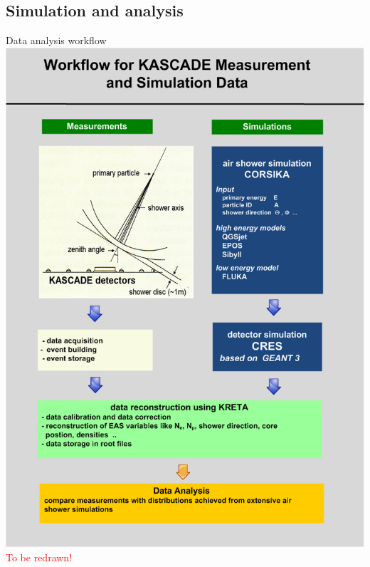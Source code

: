 \documentclass[18pt]{beamer}
\begin{document}
\subsection{Simulation and analysis}

\begin{frame}{Data analysis workflow}
\centering
\includegraphics[height=0.7\textheight]{pics/KASCADE-Workflow.png}\\
\textcolor{red}{To be redrawn!}
\end{frame}
\end{document}
